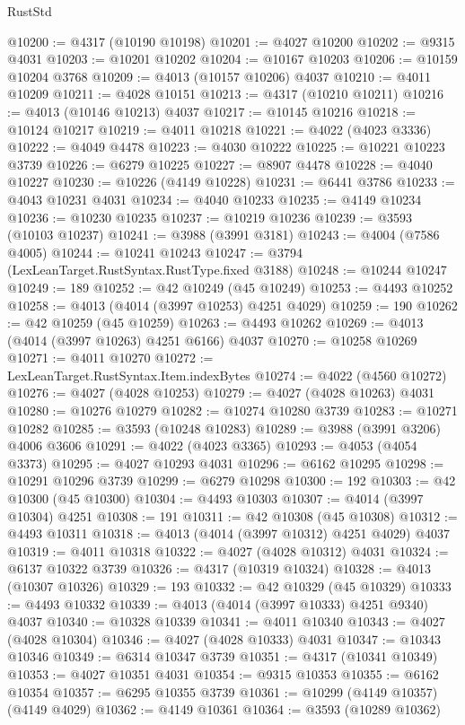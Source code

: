 \begin{lexlean}{RustStd}
\begin{coremodule}
@10200 := @4317 (@10190 @10198)
@10201 := @4027 @10200
@10202 := @9315 @4031
@10203 := @10201 @10202
@10204 := @10167 @10203
@10206 := @10159 @10204 @3768
@10209 := @4013 (@10157 @10206) @4037
@10210 := @4011 @10209
@10211 := @4028 @10151
@10213 := @4317 (@10210 @10211)
@10216 := @4013 (@10146 @10213) @4037
@10217 := @10145 @10216
@10218 := @10124 @10217
@10219 := @4011 @10218
@10221 := @4022 (@4023 @3336)
@10222 := @4049 @4478
@10223 := @4030 @10222
@10225 := @10221 @10223 @3739
@10226 := @6279 @10225
@10227 := @8907 @4478
@10228 := @4040 @10227
@10230 := @10226 (@4149 @10228)
@10231 := @6441 @3786
@10233 := @4043 @10231 @4031
@10234 := @4040 @10233
@10235 := @4149 @10234
@10236 := @10230 @10235
@10237 := @10219 @10236
@10239 := @3593 (@10103 @10237)
@10241 := @3988 (@3991 @3181)
@10243 := @4004 (@7586 @4005)
@10244 := @10241 @10243
@10247 := @3794 (LexLeanTarget.RustSyntax.RustType.fixed @3188)
@10248 := @10244 @10247
@10249 := 189
@10252 := @42 @10249 (@45 @10249)
@10253 := @4493 @10252
@10258 := @4013 (@4014 (@3997 @10253) @4251 @4029)
@10259 := 190
@10262 := @42 @10259 (@45 @10259)
@10263 := @4493 @10262
@10269 := @4013 (@4014 (@3997 @10263) @4251 @6166) @4037
@10270 := @10258 @10269
@10271 := @4011 @10270
@10272 := LexLeanTarget.RustSyntax.Item.indexBytes
@10274 := @4022 (@4560 @10272)
@10276 := @4027 (@4028 @10253)
@10279 := @4027 (@4028 @10263) @4031
@10280 := @10276 @10279
@10282 := @10274 @10280 @3739
@10283 := @10271 @10282
@10285 := @3593 (@10248 @10283)
@10289 := @3988 (@3991 @3206) @4006 @3606
@10291 := @4022 (@4023 @3365)
@10293 := @4053 (@4054 @3373)
@10295 := @4027 @10293 @4031
@10296 := @6162 @10295
@10298 := @10291 @10296 @3739
@10299 := @6279 @10298
@10300 := 192
@10303 := @42 @10300 (@45 @10300)
@10304 := @4493 @10303
@10307 := @4014 (@3997 @10304) @4251
@10308 := 191
@10311 := @42 @10308 (@45 @10308)
@10312 := @4493 @10311
@10318 := @4013 (@4014 (@3997 @10312) @4251 @4029) @4037
@10319 := @4011 @10318
@10322 := @4027 (@4028 @10312) @4031
@10324 := @6137 @10322 @3739
@10326 := @4317 (@10319 @10324)
@10328 := @4013 (@10307 @10326)
@10329 := 193
@10332 := @42 @10329 (@45 @10329)
@10333 := @4493 @10332
@10339 := @4013 (@4014 (@3997 @10333) @4251 @9340) @4037
@10340 := @10328 @10339
@10341 := @4011 @10340
@10343 := @4027 (@4028 @10304)
@10346 := @4027 (@4028 @10333) @4031
@10347 := @10343 @10346
@10349 := @6314 @10347 @3739
@10351 := @4317 (@10341 @10349)
@10353 := @4027 @10351 @4031
@10354 := @9315 @10353
@10355 := @6162 @10354
@10357 := @6295 @10355 @3739
@10361 := @10299 (@4149 @10357) (@4149 @4029)
@10362 := @4149 @10361
@10364 := @3593 (@10289 @10362)

\end{coremodule}
\end{lexlean}
